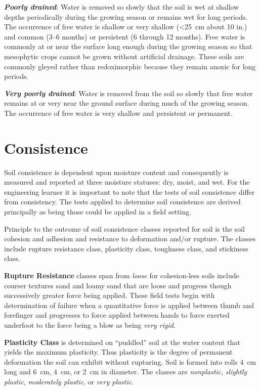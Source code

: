 \documentclass[letterpaper, 12pt]{article}
\begin{document}
\textbf{\textit{Poorly drained}}: Water is removed so slowly that the soil is wet at shallow depths periodically during the growing season or remains wet for long periods. The occurrence of free water is shallow or very shallow (\textless{}\qty{25}{cm} about 10 in.) and common (\numrange{3}{6} months) or persistent (6 through 12 months). Free water is commonly at or near the surface long enough during the growing season so that mesophytic crops cannot be grown without artificial drainage. These soils are commonly gleyed rather than redoximorphic  because they remain anoxic for long periods.

\textbf{\textit{Very poorly drained}}: Water is removed from the soil so slowly that free water remains at or very near the ground surface during much of the growing season. The occurrence of free water is very shallow and persistent or permanent.

\section{Consistence}
\label{consistence}

Soil consistence is dependent upon moisture content and consequently is measured and reported at three moisture statuses: dry, moist, and wet. For the engineering learner it is important to note that the tests of soil consistence differ from consistency. The tests applied to determine soil consistence are derived principally as being those could be applied in a field setting.

Principle to the outcome of soil consistence classes reported for soil is the soil cohesion and adhesion and resistance to deformation and/or rupture. The classes include rupture resistance class, plasticity class, toughness class, and stickiness class.

\textbf{Rupture Resistance} classes span from \textit{loose} for cohesion-less soils include courser textures sand and loamy sand that are loose and progress though successively greater force being applied. These field tests begin with determination of failure when a quantitative force is applied between thumb and forefinger and progresses to force applied between hands to force exerted underfoot to the force being a blow as being \textit{very rigid}.

\textbf{Plasticity Class} is determined on \enquote{puddled} soil at the water content that yields the maximum plasticity. Thus plasticity is the degree of permanent deformation the soil can exhibit without rupturing. Soil is formed into rolls \qty{4}{cm} long and \qty{6}{cm}, \qty{4}{cm}, or \qty{2}{cm} in diameter. The classes are \textit{nonplastic}, \textit{slightly plastic}, \textit{moderately plastic}, or \textit{very plastic}.
\end{document}
